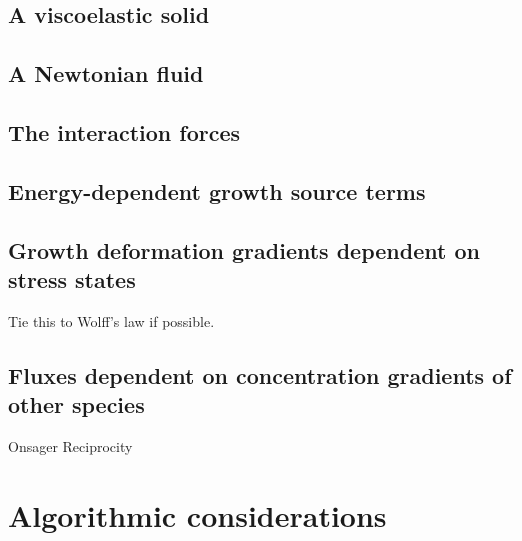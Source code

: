 \subsection{A viscoelastic solid}
\label{eu-viscoelastic-solid}



\subsection{A Newtonian fluid}
\label{eu-newtonian-fluid}

\subsection{The interaction forces}
\label{eu-forces-between-phases}

\subsection{Energy-dependent growth source terms}
\label{eu-energy-dependent-source}

\subsection{Growth deformation gradients dependent on stress states}
\label{eu-stress-dependent-source}
Tie this to Wolff's law if possible.


\subsection{Fluxes dependent on concentration gradients of other
  species}
\label{eu-onsager-reciprocity}
Onsager Reciprocity

\section{Algorithmic considerations}
\label{eu-algorithmic-considerations}
